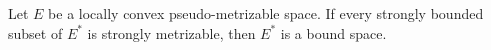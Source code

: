 Let $E$ be a locally convex pseudo-metrizable space. If every strongly bounded subset of $E^{*}$ is strongly metrizable, then $E^{*}$ is a bound space.
